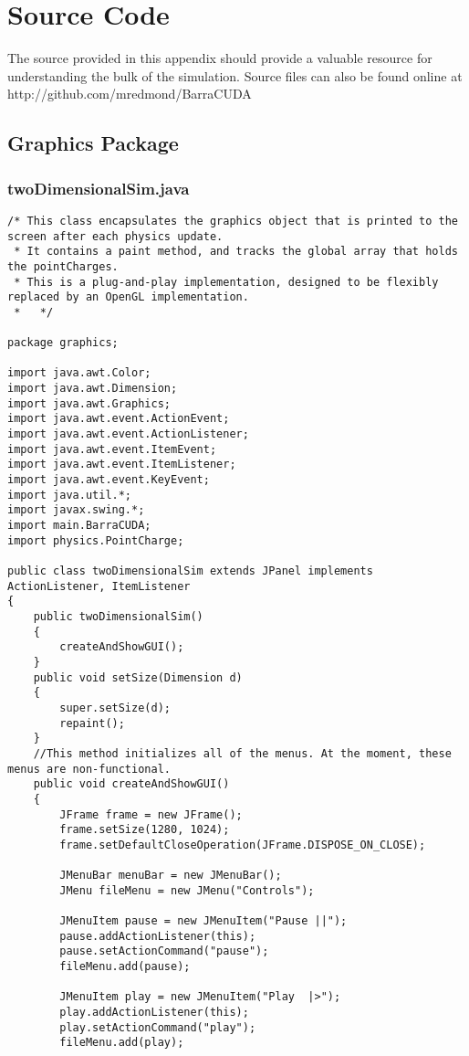 \documentclass[10pt]{article}
\begin{document}
\appendix
\section{Source Code}
The source provided in this appendix should provide a valuable resource for understanding the bulk of the simulation. Source files can also be found online at http://github.com/mredmond/BarraCUDA

\subsection{Graphics Package}
\subsubsection{twoDimensionalSim.java}
\tiny
\begin{verbatim}
/* This class encapsulates the graphics object that is printed to the screen after each physics update.
 * It contains a paint method, and tracks the global array that holds the pointCharges.
 * This is a plug-and-play implementation, designed to be flexibly replaced by an OpenGL implementation.
 *   */

package graphics;

import java.awt.Color;
import java.awt.Dimension;
import java.awt.Graphics;
import java.awt.event.ActionEvent;
import java.awt.event.ActionListener;
import java.awt.event.ItemEvent;
import java.awt.event.ItemListener;
import java.awt.event.KeyEvent;
import java.util.*;
import javax.swing.*;
import main.BarraCUDA;
import physics.PointCharge;

public class twoDimensionalSim extends JPanel implements ActionListener, ItemListener
{
	public twoDimensionalSim()
	{
		createAndShowGUI();	
	}
	public void setSize(Dimension d)
	{
		super.setSize(d);
		repaint();
	}
	//This method initializes all of the menus. At the moment, these menus are non-functional.
	public void createAndShowGUI()
	{
		JFrame frame = new JFrame();
		frame.setSize(1280, 1024);
		frame.setDefaultCloseOperation(JFrame.DISPOSE_ON_CLOSE);
			
		JMenuBar menuBar = new JMenuBar();
		JMenu fileMenu = new JMenu("Controls");
		
		JMenuItem pause = new JMenuItem("Pause ||");
		pause.addActionListener(this);
		pause.setActionCommand("pause");
		fileMenu.add(pause);
		
		JMenuItem play = new JMenuItem("Play  |>");
		play.addActionListener(this);
		play.setActionCommand("play");
		fileMenu.add(play);
		

\end{verbatim}
\end{document}
